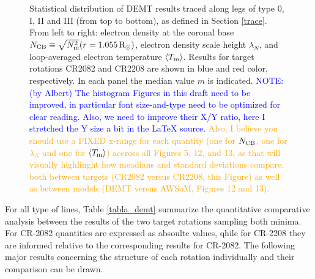 \documentclass[namedreferences]{solarphysics}
\newcommand{\mrsun}{{\rm R_\odot}}
\newcommand{\lN}{\lambda_N}
\newcommand{\NCB}{N_{\rm CB}}
\newcommand{\Tm}{T_{\rm m}}
\newcommand{\aTm}{\left<\Tm\right>}
\newcommand{\Nsqm}{N^2_{{\rm m}}}
\newcommand{\sqravgN}{\sqrt{\Nsqm}}
\def\albert#1{\textcolor{orange}{#1}}
\def\notebyalbert#1{\textcolor{blue}{NOTE: #1}}
\begin{document}
\begin{article}
\begin{figure}[h!]
\begin{center}
\caption{{Statistical distribution of DEMT results traced along legs of type 0, I, II and III (from top to bottom), as defined in Section \ref{trace}. From left to right: electron density at the coronal base $\NCB\equiv\sqravgN(r=1.055\,\mrsun)$, electron density scale height $\lN$, and loop-averaged electron temperature $\aTm$. Results for target rotations CR2082 and CR2208 are shown in blue and red color, respectively. In each panel the median value $m$ is indicated.} \notebyalbert{ (by Albert) The histogram Figures in this draft need to be improved, in particular font size-and-type need to be optimized for clear reading. Also, we need to improve their X/Y ratio, here I stretched the Y size a bit in the LaTeX source.} \albert{Also, I believe you should use a FIXED x-range for each quantity (one for $\NCB$, one for $\lambda_N$ and one for $\aTm$) accross all Figures 5, 12, and 13, as that will visually highlinght how meadians and standard deviations compare, both between targets (CR2082 versus CR2208, this Figure) as well as between models (DEMT versus AWSoM, Figures 12 and 13).}}
\label{histos_fulldemt}
\end{center}
\end{figure} 

For all type of lines, Table \ref{tabla_demt} summarize the quantitative comparative analysis between the results of the two target rotations sampling both minima. For CR-2082 quantities are expressed as absoulte values, qhile for CR-2208 they are informed relative to the corresponding results for CR-2082. The following major results concerning the structure of each rotation individually and their comparison can be drawn.


\end{article}
\end{document}
